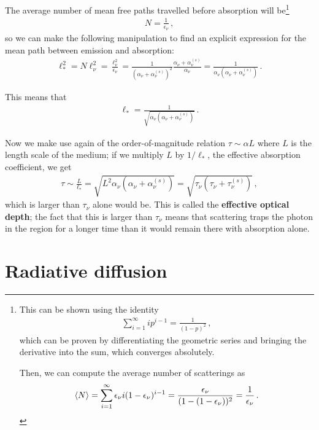 \documentclass[main.tex]{subfiles}
\begin{document}
The average number of mean free paths travelled before absorption will be\footnote{This can be shown using the identity 
%
\begin{align}
\sum _{i=1}^{\infty } i p^{i-1} = \frac{1}{(1-p)^2}
\,,
\end{align}
%
which can be proven by differentiating the geometric series and bringing the derivative into the sum, which converges absolutely. 

Then, we can compute the average number of scatterings as 
%
\begin{align}
\expval{N} = \sum _{i=1}^{\infty } \epsilon_{\nu } i (1 - \epsilon_{\nu })^{i-1} = \frac{\epsilon_{\nu }}{(1 - (1 - \epsilon_{\nu }))^2} = \frac{1}{\epsilon_{\nu }}
\,.
\end{align}} 
%
\begin{align}
N = \frac{1}{\epsilon_{\nu }}
\,,
\end{align}
%
so we can make the following manipulation to find an explicit expression for the mean path between emission and absorption: 
%
\begin{align}
\ell_{*}^2 = N \ell_{\nu }^2 = \frac{\ell_{\nu }^2}{\epsilon_{\nu }}
= \frac{1}{(\alpha_{\nu } + \alpha_{\nu }^{(s)} )^2} \frac{\alpha_{\nu }+ \alpha_{\nu }^{(s)}}{\alpha_{\nu }} 
= \frac{1}{\alpha_{\nu } (\alpha_{\nu } + \alpha_{\nu }^{(s)})}
\,.
\end{align}

This means that 
%
\begin{align}
\ell_{*} = \frac{1}{\sqrt{\alpha_{\nu } (\alpha_{\nu } + \alpha_{\nu }^{(s)})}}
\,.
\end{align}

Now we make use again of the order-of-magnitude relation \(\tau \sim \alpha L\) where \(L\) is the length scale of the medium; if we multiply \(L\) by \(1 / \ell_{*}\), the effective absorption coefficient, we get 
%
\begin{align}
\tau \sim \frac{L}{\ell_{*}} = \sqrt{L^2 \alpha_{\nu } (\alpha_{\nu } + \alpha_{\nu }^{(s)})} = \sqrt{\tau_{\nu } (\tau_{\nu } + \tau_{\nu }^{(s)})}
\,,
\end{align}
%
which is larger than \(\tau_{\nu }\) alone would be. This is called the \textbf{effective optical depth}; the fact that this is larger than \(\tau_{\nu }\) means that scattering traps the photon in the region for a longer time than it would remain there with absorption alone. 

\section{Radiative diffusion}
\end{document}
